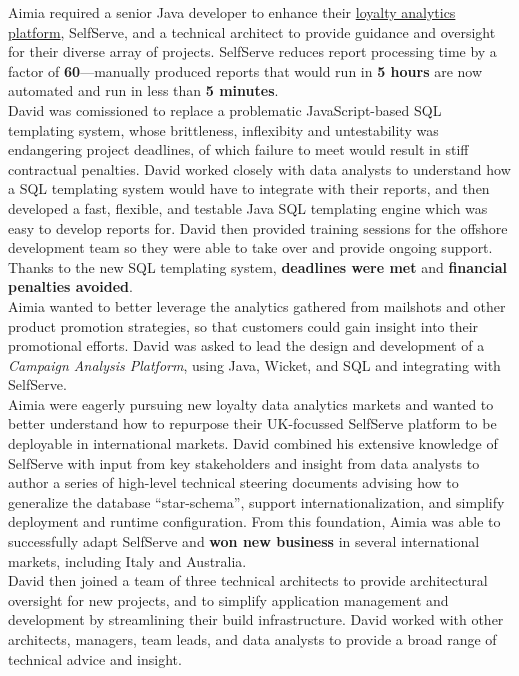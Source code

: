 \documentclass[a4paper,12pt]{article}
\begin{document}
Aimia required a senior Java developer to enhance their \href{http://www.aimia.com/English/Services/Loyalty-Analytics/default.aspx}{loyalty analytics platform}, SelfServe, and a technical architect to provide guidance and oversight for their diverse array of projects. SelfServe reduces report processing time by a factor of \textbf{60}---manually produced reports that would run in \textbf{5 hours} are now automated and run in less than \textbf{5 minutes}.\\

David was comissioned to replace a problematic JavaScript-based SQL templating system, whose brittleness, inflexibity and untestability was endangering project deadlines, of which failure to meet would result in stiff contractual penalties. David worked closely with data analysts to understand how a SQL templating system would have to integrate with their reports, and then developed a fast, flexible, and testable Java SQL templating engine which was easy to develop reports for. David then provided training sessions for the offshore development team so they were able to take over and provide ongoing support. Thanks to the new SQL templating system, \textbf{deadlines were met} and \textbf{financial penalties avoided}. \\

Aimia wanted to better leverage the analytics gathered from mailshots and other product promotion strategies, so that customers could gain insight into their promotional efforts. David was asked to lead the design and development of a \emph{Campaign Analysis Platform}, using Java, Wicket, and SQL and integrating with SelfServe.\\

Aimia were eagerly pursuing new loyalty data analytics markets and wanted to better understand how to repurpose their UK-focussed SelfServe platform to be deployable in international markets. David combined his extensive knowledge of SelfServe with input from key stakeholders and insight from data analysts to author a series of high-level technical steering documents advising how to generalize the database ``star-schema'', support internationalization, and simplify deployment and runtime configuration. From this foundation, Aimia was able to successfully adapt SelfServe and \textbf{won new business} in several international markets, including Italy and Australia.\\

David then joined a team of three technical architects to provide architectural oversight for new projects, and to simplify application management and development by streamlining their build infrastructure. David worked with other architects, managers, team leads, and data analysts to provide a broad range of technical advice and insight.\\
\end{document}
